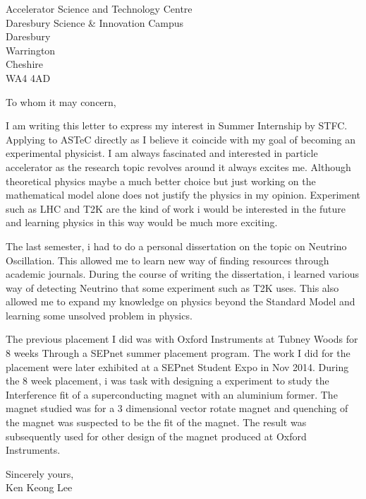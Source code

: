 \documentclass[11pt]{letter} %
\begin{document}

\begin{letter}{Accelerator Science and Technology Centre\\Daresbury Science \& Innovation Campus\\Daresbury\\Warrington\\Cheshire\\WA4 4AD}


\opening{To whom it may concern,} 

I am writing this letter to express my interest in Summer Internship by STFC. Applying to ASTeC directly as I believe it coincide with my goal of becoming an experimental physicist. I am always fascinated and interested in particle accelerator as the research topic revolves around it always excites me. Although theoretical physics maybe a much better choice but just working on the mathematical model alone does not justify the physics in my opinion. Experiment such as LHC and T2K are the kind of work i would be interested in the future and learning physics in this way would be much more exciting.

The last semester, i had to do a personal dissertation on the topic on Neutrino Oscillation. This allowed me to learn new way of finding resources through academic journals. During the course of writing the dissertation, i learned various way of detecting Neutrino that some experiment such as T2K uses. This also allowed me to expand my knowledge on physics beyond the Standard Model and learning some unsolved problem in physics.  

The previous placement I did was with Oxford Instruments at Tubney Woods for 8 weeks Through a SEPnet summer placement program. The work I did for the placement were later exhibited at a SEPnet Student Expo in Nov 2014. During the 8 week placement, i was task with designing a experiment to study the Interference fit of a superconducting magnet with an aluminium former. The magnet studied was for a 3 dimensional vector rotate magnet and quenching of the magnet was suspected to be the fit of the magnet.  The result was subsequently used for other design of the magnet produced at Oxford Instruments.



\closing{Sincerely yours,\\Ken Keong Lee}




\end{letter}
\end{document}
